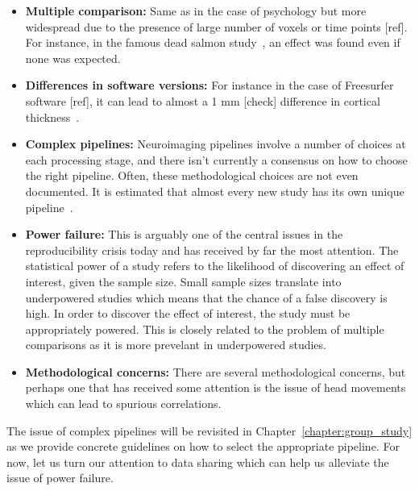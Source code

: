 \begin{itemize}[noitemsep,partopsep=0pt]
\item \textbf{Multiple comparison:} Same as in the case of psychology but more widespread due to the presence of large number of voxels or time points [ref]. For instance, in the famous dead salmon study~\citep{bennett2009neural}, an effect was found even if none was expected.
\item \textbf{Differences in software versions:} For instance in the case of Freesurfer software [ref], it can lead to almost a 1 mm [check] difference in cortical thickness~\citep{gronenschild2012effects}.
\item \textbf{Complex pipelines:} Neuroimaging pipelines involve a number of choices at each processing stage, and there isn't currently a consensus on how to choose the right pipeline. Often, these methodological choices are not even documented. It is estimated that almost every new study has its own unique pipeline~\citep{Carp2012289}.
\item \textbf{Power failure:} This is arguably one of the central issues in the reproducibility crisis today and has received by far the most attention. The statistical power of a study refers to the likelihood of discovering an effect of interest, given the sample size. Small sample sizes translate into underpowered studies which means that the chance of a false discovery is high. In order to discover the effect of interest, the study must be appropriately powered. This is closely related to the problem of multiple comparisons as it is more prevelant in underpowered studies.
\item \textbf{Methodological concerns:} There are several methodological concerns, but perhaps one that has received some attention is the issue of head movements~\citep{yendiki2014spurious} which can lead to spurious correlations.
\end{itemize}

The issue of complex pipelines will be revisited in Chapter~\ref{chapter:group_study} as we provide concrete guidelines on how to select the appropriate pipeline. For now, let us turn our attention to data sharing which can help us alleviate the issue of power failure.

\clearpage
